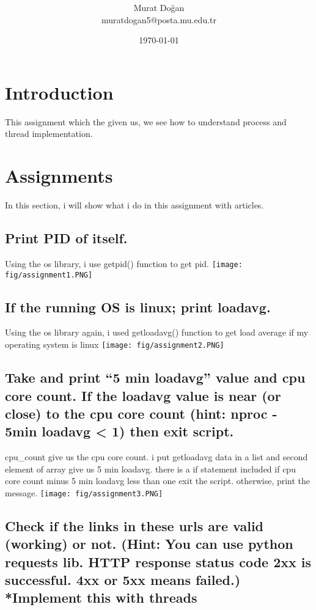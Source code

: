 \documentclass[onecolumn]{article}
\title{\spacecaps{Assignment Report 1: Process and Thread Implementation}\\ \normalsize \spacesc{CENG2034, Operating Systems} }
\author{Murat Doğan\\muratdogan5@posta.mu.edu.tr}
\date{\today}
\begin{document}
\maketitle




\section{Introduction}
This assignment which the given us, we see how to understand process and thread implementation.

\section{Assignments}
In this section, i will show what i do in this assignment with articles.

\subsection{ Print PID of itself. }

Using the os library, i use getpid() function to get pid.
    \newline
    \texttt{[image: fig/assignment1.PNG]}
\subsection{ If the running OS is linux; print loadavg.  }

Using the os library again, i used getloadavg() function to get load average if my operating system is linux
    \newline
    \texttt{[image: fig/assignment2.PNG]}

\subsection{  Take and print “5 min loadavg” value and cpu core count. If the loadavg value is near (or close) to the cpu core count (hint: nproc - 5min loadavg < 1) then exit script.  }
cpu\_count give us the cpu core count. i put getloadavg data in a list and second element of array give us 5 min loadavg. there is a if statement included if cpu core count minus 5 min loadavg less than one exit the script. otherwise, print the message.
    \newline
    \texttt{[image: fig/assignment3.PNG]}

\subsection{ Check if the links in these urls are valid (working) or not. (Hint: You can use python requests lib. HTTP response status code 2xx is successful. 4xx or 5xx means failed.) *Implement this with threads }
\end{document}
